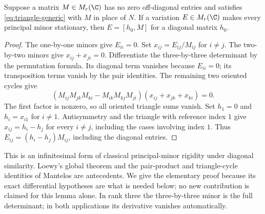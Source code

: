 \begin{lemma}\label{lem:minors}
Suppose a matrix $M\in M_r(\C)$ has no zero off-diagonal entries and
satisfies \eqref{eq:triangle-generic} with $M$ in place of $N$. If a
variation $E\in M_r(\C)$ makes every principal minor stationary, then
$E=[h_0,M]$ for a diagonal matrix $h_0$.
\end{lemma}
\begin{proof}
The one-by-one minors give $E_{ii}=0$. Set $x_{ij}=E_{ij}/M_{ij}$ for
$i\ne j$. The two-by-two minors give $x_{ij}+x_{ji}=0$.
Differentiate the three-by-three determinant by the permutation formula.
Its diagonal term vanishes because $E_{ii}=0$; its transposition terms
vanish by the pair identities. The remaining two oriented cycles give
\[
 (M_{ij}M_{jk}M_{ki}-M_{ik}M_{kj}M_{ji})
                 (x_{ij}+x_{jk}+x_{ki})=0.
\]
The first factor is nonzero, so all oriented triangle sums vanish.
Set $h_1=0$ and $h_i=x_{i1}$ for $i\ne1$. Antisymmetry and the triangle
with reference index $1$ give $x_{ij}=h_i-h_j$ for every $i\ne j$,
including the cases involving index $1$. Thus
$E_{ij}=(h_i-h_j)M_{ij}$, including the diagonal entries.
\end{proof}

This is an infinitesimal form of classical principal-minor rigidity under
diagonal similarity. Loewy's global theorem \cite{Loewy} and the
pair-product and triangle-cycle identities of Mantelos
\cite[Sections 3--4 and Lemma 6.2]{Mantelos} are antecedents.
We give the elementary proof because its exact differential hypotheses
are what is needed below; no new contribution is claimed for this lemma
alone. In rank three the three-by-three minor is the full determinant;
in both applications its derivative vanishes automatically.

